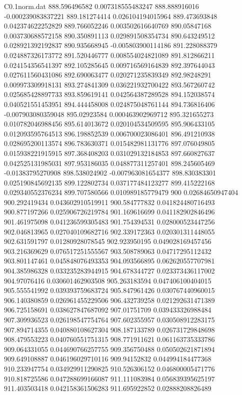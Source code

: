 \begin{filecontents}{C0.1norm.dat}
888.596496582		0.007318555483247
888.888916016		-0.000239083837221
889.181274414		0.026104194015964
889.473693848		0.042374622252829
889.766052246		0.003502616640769
890.05847168		0.003730688572158
890.350891113		0.029891508354734
890.643249512		0.028921392192837
890.935668945		-0.005803900114186
891.228088379		0.024887326173772
891.520446777		0.008554024821089
891.812866211		0.024154356541397
892.105285645		0.009716569164839
892.397644043		0.027611560431086
892.690063477		0.020271235839349
892.98248291		0.009973309918131
893.274841309		0.036221932700422
893.567260742		0.025685428897733
893.859619141		0.042564387289528
894.152038574		0.040521551453951
894.444458008		0.024875048761144
894.736816406		-0.007903080359048
895.02923584		0.000463902969712
895.321655273		0.010782046988456
895.614013672		0.020104534509595
895.906433105		0.012093595764513
896.198852539		0.006700023086401
896.491210938		0.028695200113574
896.783630371		0.015482981131776
897.076049805		0.015938221915915
897.368408203		0.031029132184853
897.660827637		0.042525131985031
897.953186035		0.048877311257401
898.245605469		-0.01383795270908
898.538024902		-0.007963081654377
898.830383301		0.025190845692135
899.122802734		0.037177484123277
899.415222168		0.029340552376234
899.707580566		0.010989185779479
900		0.02684650947404
900.292419434		0.043602910519911
900.584777832		0.041824480716493
900.877197266		0.025906726219784
901.169616699		0.041182902846496
901.461975098		0.041236599305483
901.754394531		0.028000523447256
902.046813965		0.027040109682716
902.339172363		0.020301311448055
902.631591797		0.01280928078545
902.923950195		0.049028169457456
903.216369629		0.076517251555567
903.508789063		0.04717295112432
903.801147461		0.045848076493353
904.093566895		0.062620557707981
904.385986328		0.033235283944915
904.678344727		0.023373436117002
904.97076416		0.030601462903508
905.263183594		0.047406100404015
905.555541992		0.039393759683724
905.847961426		0.030767440960015
906.140380859		0.026961455229506
906.432739258		0.021292631471389
906.725158691		0.038627847687092
907.01751709		0.039433326988484
907.309936523		0.026198547754764
907.602355957		0.030508912283175
907.894714355		0.040880108627304
908.187133789		0.026731729848698
908.479553223		0.040760551751315
908.771911621		0.061163735333786
909.064331055		0.044690766257755
909.356750488		0.050502621871894
909.649108887		0.046196029710116
909.94152832		0.044994184477368
910.233947754		0.034929911290825
910.526306152		0.046800005471776
910.818725586		0.047288699166087
911.111083984		0.056839395625197
911.403503418		0.042158361506283
911.695922852		0.02888208826489

\end{filecontents}
